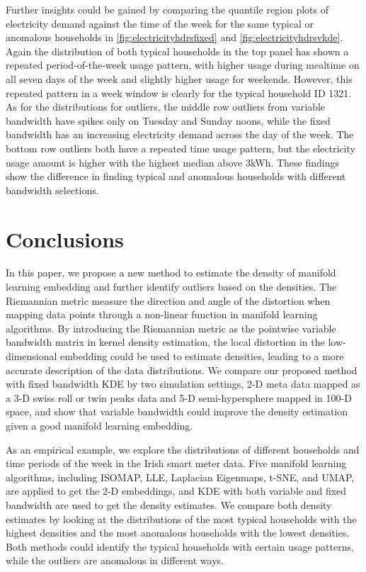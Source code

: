 \documentclass[11pt,a4paper,]{article}
\begin{document}
Further insights could be gained by comparing the quantile region plots of electricity demand against the time of the week for the same typical or anomalous households in \autoref{fig:electricityhdrsfixed} and \autoref{fig:electricityhdrsvkde}. Again the distribution of both typical households in the top panel has shown a repeated period-of-the-week usage pattern, with higher usage during mealtime on all seven days of the week and slightly higher usage for weekends.
However, this repeated pattern in a week window is clearly for the typical household ID 1321. As for the distributions for outliers, the middle row outliers from variable bandwidth have spikes only on Tuesday and Sunday noons, while the fixed bandwidth has an increasing electricity demand across the day of the week. The bottom row outliers both have a repeated time usage pattern, but the electricity usage amount is higher with the highest median above 3kWh. These findings show the difference in finding typical and anomalous households with different bandwidth selections.

\hypertarget{conclusion}{%
\section{Conclusions}\label{conclusion}}

In this paper, we propose a new method to estimate the density of manifold learning embedding and further identify outliers based on the densities. The Riemannian metric measure the direction and angle of the distortion when mapping data points through a non-linear function in manifold learning algorithms. By introducing the Riemannian metric as the pointwise variable bandwidth matrix in kernel density estimation, the local distortion in the low-dimensional embedding could be used to estimate densities, leading to a more accurate description of the data distributions. We compare our proposed method with fixed bandwidth KDE by two simulation settings, 2-D meta data mapped as a 3-D swiss roll or twin peaks data and 5-D semi-hypersphere mapped in 100-D space, and show that variable bandwidth could improve the density estimation given a good manifold learning embedding.

As an empirical example, we explore the distributions of different households and time periods of the week in the Irish smart meter data. Five manifold learning algorithms, including ISOMAP, LLE, Laplacian Eigenmaps, t-SNE, and UMAP, are applied to get the 2-D embeddings, and KDE with both variable and fixed bandwidth are used to get the density estimates. We compare both density estimates by looking at the distributions of the most typical households with the highest densities and the most anomalous households with the lowest densities. Both methods could identify the typical households with certain usage patterns, while the outliers are anomalous in different ways.
\end{document}
